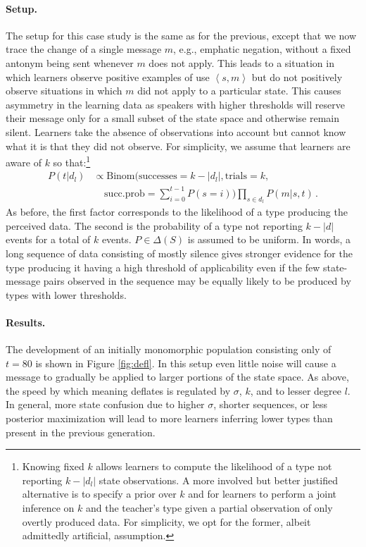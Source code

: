 \documentclass[10pt,a4paper]{article}
\newcommand{\tuple}[1]{\ensuremath{\left\langle #1 \right\rangle}}
\begin{document}
\paragraph{Setup.} The setup for this case study is the same as for the previous, except that
we now trace the change of a single message $m$, e.g., emphatic negation, without a fixed
antonym being sent whenever $m$ does not apply. This leads to a situation in which learners
observe positive examples of use $\tuple{s,m}$ but do not positively observe situations in
which $m$ did not apply to a particular state. This causes asymmetry in the learning data
as speakers with higher thresholds will reserve their message only for a small subset of the
state space and otherwise remain silent. Learners take the absence of observations into account
but cannot know what it is that they did not observe. For simplicity, we assume that learners
are aware of $k$ so that:\footnote{Knowing fixed $k$ allows learners to compute the likelihood
  of a type not reporting $k -|d_l|$ state observations. A more involved but better justified
  alternative is to specify a prior over $k$ and for learners to perform a joint inference on
  $k$ and the teacher's type given a partial observation of only overtly produced data. For
  simplicity, we opt for the former, albeit admittedly artificial, assumption.}
\begin{align*}
  P(t | d_l) & \propto \text{Binom}(\text{successes} =
  k-|d_l|, \text{trials} = k, \\
  & 
  \ \ \ \ \ \text{succ.prob} = \sum_{i=0}^{t-1} P(s = i)) \prod_{s \in d_l} P(m|s,t)\,.
\end{align*}
As before, the first factor corresponds to the
likelihood of a type producing the perceived data.  The second is the probability of a type not
reporting $k-|d|$ events for a total of $k$ events. $P \in \Delta(S)$ is assumed to be
uniform. In words, a long sequence of data consisting of mostly silence gives stronger evidence
for the type producing it having a high threshold of applicability even if the few state-message pairs observed in
the sequence may be equally likely to be produced by types with lower thresholds.

\paragraph{Results.} The development of an initially monomorphic population consisting only of
$t = 80$ is shown in Figure \ref{fig:defl}. In this setup even little noise will cause a
message to gradually be applied to larger portions of the state space. As above, the speed by
which meaning deflates is regulated by $\sigma$, $k$, and to lesser degree $l$. In general,
more state confusion due to higher $\sigma$, shorter sequences, or less posterior maximization
will lead to more learners inferring lower types than present in the previous generation.
\end{document}
